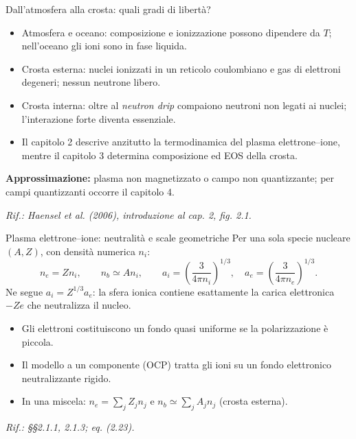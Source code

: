 
\begin{frame}[t]{Dall'atmosfera alla crosta: quali gradi di libertà?}
\small
\begin{itemize}
\item Atmosfera e oceano: composizione e ionizzazione possono dipendere da $T$; nell'oceano gli ioni sono in fase liquida.
\item Crosta esterna: nuclei ionizzati in un reticolo coulombiano e gas di elettroni degeneri; nessun neutrone libero.
\item Crosta interna: oltre al \emph{neutron drip} compaiono neutroni non legati ai nuclei; l'interazione forte diventa essenziale.
\item Il capitolo 2 descrive anzitutto la termodinamica del plasma elettrone--ione, mentre il capitolo 3 determina composizione ed EOS della crosta.
\end{itemize}
\medskip
\textbf{Approssimazione:} plasma non magnetizzato o campo non quantizzante; per campi quantizzanti occorre il capitolo 4.
\par\scriptsize\emph{Rif.: Haensel et al. (2006), introduzione al cap. 2, fig. 2.1.}
\end{frame}

\begin{frame}[t]{Plasma elettrone--ione: neutralità e scale geometriche}
\small
Per una sola specie nucleare $(A,Z)$, con densità numerica $n_i$:
\[
 n_e=Zn_i,\qquad n_b\simeq An_i,\qquad
 a_i=\left(\frac{3}{4\pi n_i}\right)^{1/3},\quad
 a_e=\left(\frac{3}{4\pi n_e}\right)^{1/3}.
\]
Ne segue $a_i=Z^{1/3}a_e$: la sfera ionica contiene esattamente la carica elettronica $-Ze$ che neutralizza il nucleo.
\medskip
\begin{itemize}
\item Gli elettroni costituiscono un fondo quasi uniforme se la polarizzazione è piccola.
\item Il modello a un componente (OCP) tratta gli ioni su un fondo elettronico neutralizzante rigido.
\item In una miscela: $n_e=\sum_j Z_jn_j$ e $n_b\simeq\sum_j A_jn_j$ (crosta esterna).
\end{itemize}
\par\scriptsize\emph{Rif.: §§2.1.1, 2.1.3; eq. (2.23).}
\end{frame}

